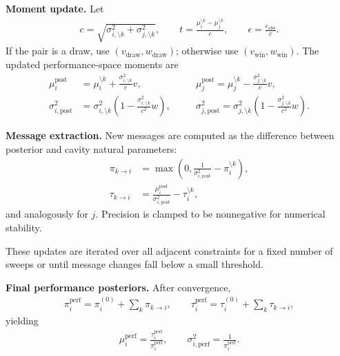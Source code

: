 \documentclass{article}
\theoremstyle{plain}
\theoremstyle{definition}
\theoremstyle{remark}
\begin{document}
\textbf{Moment update.}  
Let
\begin{align*}
c=\sqrt{\sigma_{i,\setminus k}^2+\sigma_{j,\setminus k}^2}, \qquad
t=\frac{\mu_i^{\setminus k}-\mu_j^{\setminus k}}{c}, \qquad
\epsilon=\frac{\epsilon_{\mathrm{abs}}}{c}.
\end{align*}
If the pair is a draw, use $(v_{\text{draw}},w_{\text{draw}})$; otherwise use $(v_{\text{win}},w_{\text{win}})$. The updated performance-space moments are
\begin{align*}
\mu_i^{\text{post}} &= \mu_i^{\setminus k}+\frac{\sigma_{i,\setminus k}^2}{c}v, &&\quad
\mu_j^{\text{post}} = \mu_j^{\setminus k}-\frac{\sigma_{j,\setminus k}^2}{c}v, \\
\sigma_{i,\text{post}}^2 &= \sigma_{i,\setminus k}^2\!\left(1-\frac{\sigma_{i,\setminus k}^2}{c^2}w\right), &&\quad
\sigma_{j,\text{post}}^2 = \sigma_{j,\setminus k}^2\!\left(1-\frac{\sigma_{j,\setminus k}^2}{c^2}w\right).
\end{align*}

\textbf{Message extraction.}  
New messages are computed as the difference between posterior and cavity natural parameters:
\begin{align*}
\pi_{k\to i} &= \max\!\left(0,\frac{1}{\sigma_{i,\text{post}}^2}-\pi_i^{\setminus k}\right), \\
\tau_{k\to i} &= \frac{\mu_i^{\text{post}}}{\sigma_{i,\text{post}}^2}-\tau_i^{\setminus k},
\end{align*}
and analogously for $j$. Precision is clamped to be nonnegative for numerical stability.

These updates are iterated over all adjacent constraints for a fixed number of sweeps or until message changes fall below a small threshold.

\textbf{Final performance posteriors.}  
After convergence,
\begin{align*}
\pi_i^{\text{perf}}=\pi_i^{(0)}+\sum_k \pi_{k\to i}, \qquad
\tau_i^{\text{perf}}=\tau_i^{(0)}+\sum_k \tau_{k\to i},
\end{align*}
yielding
\begin{align*}
\mu_i^{\text{perf}}=\frac{\tau_i^{\text{perf}}}{\pi_i^{\text{perf}}}, \qquad
\sigma_{i,\text{perf}}^2=\frac{1}{\pi_i^{\text{perf}}}.
\end{align*}
\end{document}
